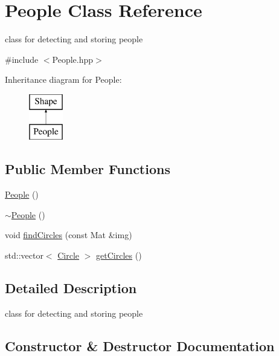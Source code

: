 \hypertarget{class_people}{}\section{People Class Reference}
\label{class_people}


class for detecting and storing people  




{\ttfamily \#include $<$People.\+hpp$>$}

Inheritance diagram for People\+:\begin{figure}[H]
\begin{center}
\leavevmode
\includegraphics[height=2.000000cm]{class_people}
\end{center}
\end{figure}
\subsection*{Public Member Functions}
\begin{DoxyCompactItemize}
\item 
\mbox{\hyperlink{class_people_aae1408eddfd15a5007003ecdf1507941}{People}} ()
\item 
\mbox{\hyperlink{class_people_adae124857f64dadff4e1801410b3dab2}{$\sim$\+People}} ()
\item 
void \mbox{\hyperlink{class_people_a4c13aebe88654dba21a2a12b8b5943f7}{find\+Circles}} (const Mat \&img)
\item 
std\+::vector$<$ \mbox{\hyperlink{class_circle}{Circle}} $>$ \mbox{\hyperlink{class_people_a0fc4e671ff110314dc0dc65ee150f04c}{get\+Circles}} ()
\end{DoxyCompactItemize}


\subsection{Detailed Description}
class for detecting and storing people 

\subsection{Constructor \& Destructor Documentation}
\mbox{\label{class_people_aae1408eddfd15a5007003ecdf1507941}} 
